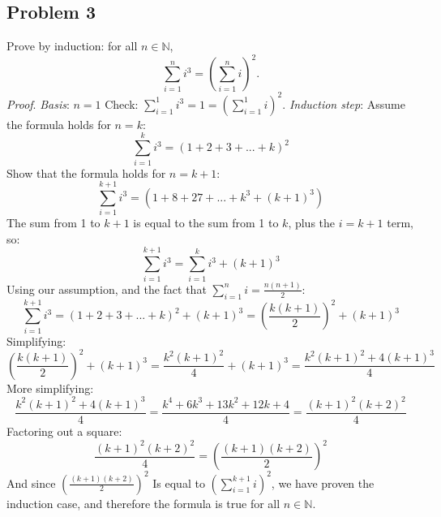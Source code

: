 \documentclass[12pt]{article}
\newcommand{\N}{\mathbb{N}}
\begin{document}
\subsection*{Problem 3}
Prove by induction: for all $n \in \N$,
$$
\sum_{i=1}^{n}i^3=\left(\sum_{i=1}^{n}i\right)^2.
$$
\emph{Proof}. \emph{Basis}: $n=1$ Check: $\sum_{i=1}^{1}i^3=1=\left(\sum_{i=1}^{1}i\right)^2.$
\newline\emph{Induction step}: Assume the formula holds for $n=k$:
$$
\sum_{i=1}^{k}i^3=\left(1+2+3+...+k\right)^2
$$
Show that the formula holds for $n=k+1$:
$$
\sum_{i=1}^{k+1}i^3=\left(1+8+27+...+k^3+\left(k+1\right)^3\right)
$$
The sum from 1 to $k+1$ is equal to the sum from 1 to $k$, plus the $i=k+1$ term, so:
$$
\sum_{i=1}^{k+1}i^3=\sum_{i=1}^{k}i^3+\left(k+1\right)^3
$$
Using our assumption, and the fact that $\sum_{i=1}^{n}i = \frac{n\left(n+1\right)}{2}$:
$$
\sum_{i=1}^{k+1}i^3=\left(1+2+3+...+k\right)^2+\left(k+1\right)^3=\left(\frac{k\left(k+1\right)}{2}\right)^2+\left(k+1\right)^3
$$
Simplifying:
$$
\left(\frac{k\left(k+1\right)}{2}\right)^2+\left(k+1\right)^3=\frac{k^2\left(k+1\right)^2}{4}+\left(k+1\right)^3=\frac{k^2\left(k+1\right)^2+4\left(k+1\right)^3}{4}
$$
More simplifying:
$$
\frac{k^2\left(k+1\right)^2+4\left(k+1\right)^3}{4}=\frac{k^4+6k^3+13k^2+12k+4}{4}=\frac{\left(k+1\right)^2\left(k+2\right)^2}{4}
$$
Factoring out a square:
$$
\frac{\left(k+1\right)^2\left(k+2\right)^2}{4}=\left(\frac{\left(k+1\right)\left(k+2\right)}{2}\right)^2
$$
And since $\left(\frac{\left(k+1\right)\left(k+2\right)}{2}\right)^2$ Is equal to $\left(\sum_{i=1}^{k+1}i\right)^2$, we have proven the induction case, and therefore the formula is true for all $n \in \N$.
\end{document}
